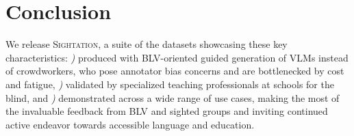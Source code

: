 \section{Conclusion}

We release \textsc{Sightation}, a suite of the datasets showcasing these key characteristics: \textit{)} produced with BLV-oriented guided generation of VLMs instead of crowdworkers, who pose annotator bias concerns and are bottlenecked by cost and fatigue, \textit{)} validated by specialized teaching professionals at schools for the blind, and \textit{)} demonstrated across a wide range of use cases, making the most of the invaluable feedback from BLV and sighted groups and inviting continued active endeavor towards accessible language and education.